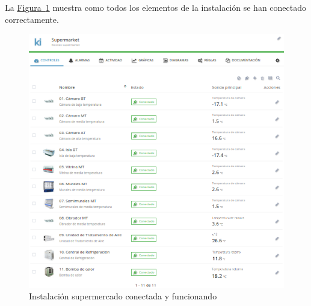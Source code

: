 \vspace*{\fill}

La \hyperref[figura:instalcionConectada]{Figura~\ref{figura:instalcionConectada}} muestra como todos los elementos de la instalación se han conectado correctamente.

\clearpage
\vspace*{\fill}

\begin{figure}[H]
  \centering
  \includegraphics[width=\textwidth, keepaspectratio]{img/instalacionConectada}
  \caption{Instalación supermercado conectada y funcionando}
  \label{figura:instalcionConectada}
\end{figure}

\vspace*{\fill}